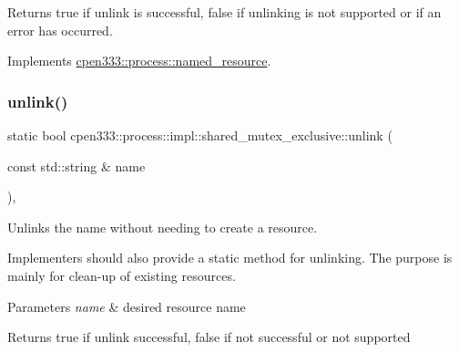 \begin{DoxyReturn}{Returns}
{\ttfamily true} if unlink is successful, {\ttfamily false} if unlinking is not supported or if an error has occurred. 
\end{DoxyReturn}


Implements \hyperlink{classcpen333_1_1process_1_1named__resource_a5d33168fee48c9b0c58ab8fd96e230ce}{cpen333\+::process\+::named\+\_\+resource}.

\mbox{\label{classcpen333_1_1process_1_1impl_1_1shared__mutex__exclusive_a5d16bc8d626096e38d6ca13b23de572e}} 
\subsubsection{\texorpdfstring{unlink()}{unlink()}\hspace{0.1cm}{\footnotesize\ttfamily [2/2]}}
{\footnotesize\ttfamily static bool cpen333\+::process\+::impl\+::shared\+\_\+mutex\+\_\+exclusive\+::unlink (\begin{DoxyParamCaption}\item[{const std\+::string \&}]{name }\end{DoxyParamCaption})\hspace{0.3cm}{\ttfamily [inline]}, {\ttfamily [static]}}



Unlinks the name without needing to create a resource. 

Implementers should also provide a static method for unlinking. The purpose is mainly for clean-\/up of existing resources.


\begin{DoxyParams}{Parameters}
{\em name} & desired resource name \\
\hline
\end{DoxyParams}
\begin{DoxyReturn}{Returns}
{\ttfamily true} if unlink successful, {\ttfamily false} if not successful or not supported 
\end{DoxyReturn}
\mbox{\label{classcpen333_1_1process_1_1impl_1_1shared__mutex__exclusive_a01bc4be0f17231c08d8a06f1341acc81}} 
